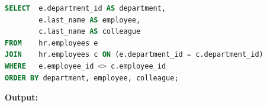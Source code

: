 \begin{frame}



\begin{lstlisting}[language=SQL]
SELECT 	e.department_id AS department,
       	e.last_name AS employee,
       	c.last_name AS colleague
FROM 	hr.employees e
JOIN 	hr.employees c ON (e.department_id = c.department_id)
WHERE 	e.employee_id <> c.employee_id
ORDER BY department, employee, colleague;
\end{lstlisting}
\textbf{Output: }
\end{frame}

\vspace{4cm}
